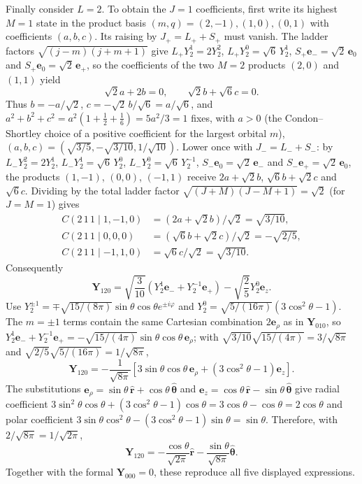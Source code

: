 Finally consider $L=2$. To obtain the $J=1$ coefficients, first
write its highest $M=1$ state in the product basis
$(m,q)=(2,-1),(1,0),(0,1)$ with coefficients $(a,b,c)$.
Its raising by $J_+=L_++S_+$ must vanish. The ladder factors
$\sqrt{(j-m)(j+m+1)}$ give $L_+Y_2^1=2Y_2^2$,
$L_+Y_2^0=\sqrt6\,Y_2^1$, $S_+\mathbf e_-=\sqrt2\,\mathbf e_0$ and
$S_+\mathbf e_0=\sqrt2\,\mathbf e_+$, so the coefficients of the two
$M=2$ products $(2,0)$ and $(1,1)$ yield
\[
\sqrt2a+2b=0,\qquad \sqrt2b+\sqrt6c=0.
\]
Thus $b=-a/\sqrt2$, $c=-\sqrt2\,b/\sqrt6=a/\sqrt6$, and
$a^2+b^2+c^2=a^2(1+\frac12+\frac16)=5a^2/3=1$ fixes, with $a>0$
(the Condon--Shortley choice of a positive coefficient for the
largest orbital $m$),
$(a,b,c)=(\sqrt{3/5},-\sqrt{3/10},1/\sqrt{10})$.
Lower once with $J_-=L_-+S_-$: by $L_-Y_2^2=2Y_2^1$,
$L_-Y_2^1=\sqrt6\,Y_2^0$, $L_-Y_2^0=\sqrt6\,Y_2^{-1}$,
$S_-\mathbf e_0=\sqrt2\,\mathbf e_-$ and
$S_-\mathbf e_+=\sqrt2\,\mathbf e_0$, the products $(1,-1)$,
$(0,0)$, $(-1,1)$ receive $2a+\sqrt2b$, $\sqrt6b+\sqrt2c$ and
$\sqrt6c$. Dividing by the total ladder factor
$\sqrt{(J+M)(J-M+1)}=\sqrt2$ (for $J=M=1$) gives
\[
\begin{aligned}
C(2\,1\,1\mid1,-1,0)&=(2a+\sqrt2b)/\sqrt2=\sqrt{3/10},\\
C(2\,1\,1\mid0,0,0)&=(\sqrt6b+\sqrt2c)/\sqrt2=-\sqrt{2/5},\\
C(2\,1\,1\mid-1,1,0)&=\sqrt6c/\sqrt2=\sqrt{3/10}.
\end{aligned}
\]
Consequently
\[
\mathbf Y_{120}=\sqrt{\frac3{10}}
(Y_2^1\mathbf e_-+Y_2^{-1}\mathbf e_+)
-\sqrt{\frac25}Y_2^0\mathbf e_z.
\]
Use $Y_2^{\pm1}=\mp\sqrt{15/(8\pi)}\sin\theta\cos\theta
e^{\pm i\varphi}$ and
$Y_2^0=\sqrt{5/(16\pi)}(3\cos^2\theta-1)$. The $m=\pm1$ terms
contain the same Cartesian combination $2\mathbf e_\rho$ as in
$\mathbf Y_{010}$, so
$Y_2^1\mathbf e_-+Y_2^{-1}\mathbf e_+
=-\sqrt{15/(4\pi)}\sin\theta\cos\theta\,\mathbf e_\rho$; with
$\sqrt{3/10}\sqrt{15/(4\pi)}=3/\sqrt{8\pi}$ and
$\sqrt{2/5}\sqrt{5/(16\pi)}=1/\sqrt{8\pi}$,
\[
\mathbf Y_{120}=-\frac1{\sqrt{8\pi}}
\left[3\sin\theta\cos\theta\,\mathbf e_\rho+
(3\cos^2\theta-1)\mathbf e_z\right].
\]
The substitutions
$\mathbf e_\rho=\sin\theta\,\hat{\mathbf r}
+\cos\theta\,\hat{\boldsymbol\theta}$ and
$\mathbf e_z=\cos\theta\,\hat{\mathbf r}
-\sin\theta\,\hat{\boldsymbol\theta}$ give radial coefficient
$3\sin^2\theta\cos\theta+(3\cos^2\theta-1)\cos\theta
=3\cos\theta-\cos\theta=2\cos\theta$
and polar coefficient
$3\sin\theta\cos^2\theta-(3\cos^2\theta-1)\sin\theta=\sin\theta$.
Therefore, with $2/\sqrt{8\pi}=1/\sqrt{2\pi}$,
\[
\boxed{\mathbf Y_{120}
=-\frac{\cos\theta}{\sqrt{2\pi}}\hat{\mathbf r}
-\frac{\sin\theta}{\sqrt{8\pi}}\hat{\boldsymbol\theta}}.
\]
Together with the formal $\mathbf Y_{000}=0$, these reproduce
all five displayed expressions.

